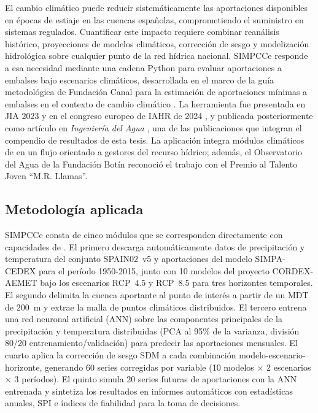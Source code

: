El cambio climático puede reducir sistemáticamente las aportaciones disponibles en épocas de estiaje en las cuencas españolas, comprometiendo el suministro en sistemas regulados. Cuantificar este impacto requiere combinar reanálisis histórico, proyecciones de modelos climáticos, corrección de sesgo y modelización hidrológica sobre cualquier punto de la red hídrica nacional. SIMPCCe responde a esa necesidad mediante una cadena Python para evaluar aportaciones a embalses bajo escenarios climáticos, desarrollada en el marco de la guía metodológica de Fundación Canal para la estimación de aportaciones mínimas a embalses en el contexto de cambio climático \parencite{fundacioncanal2022guiaembalses}. La herramienta fue presentada en JIA 2023 \parencite{navas2023simpce} y en el congreso europeo de IAHR de 2024 \parencite{navas2024iahrsimpcce}, y publicada posteriormente como artículo en \textit{Ingeniería del Agua} \parencite{navas2025simpce}, una de las publicaciones que integran el compendio de resultados de esta tesis. La aplicación integra módulos climáticos de \pyhydra en un flujo orientado a gestores del recurso hídrico; además, el Observatorio del Agua de la Fundación Botín reconoció el trabajo con el Premio al Talento Joven ``M.R. Llamas''.

\subsection{Metodología aplicada}

SIMPCCe consta de cinco módulos que se corresponden directamente con capacidades de \hydra. El primero descarga automáticamente datos de precipitación y temperatura del conjunto SPAIN02~v5 \parencite{herrera2016spain02} y aportaciones del modelo SIMPA-CEDEX para el período 1950-2015, junto con 10 modelos del proyecto CORDEX-AEMET bajo los escenarios RCP~4.5 y RCP~8.5 para tres horizontes temporales. El segundo delimita la cuenca aportante al punto de interés a partir de un MDT de 200~m y extrae la malla de puntos climáticos distribuidos. El tercero entrena una red neuronal artificial (ANN) sobre las componentes principales de la precipitación y temperatura distribuidas (PCA al 95\% de la varianza, división 80/20 entrenamiento/validación) para predecir las aportaciones mensuales. El cuarto aplica la corrección de sesgo SDM \parencite{switanek2017sdm} a cada combinación modelo-escenario-horizonte, generando 60 series corregidas por variable (10 modelos $\times$ 2 escenarios $\times$ 3 períodos). El quinto simula 20 series futuras de aportaciones con la ANN entrenada y sintetiza los resultados en informes automáticos con estadísticas anuales, SPI e índices de fiabilidad para la toma de decisiones.

